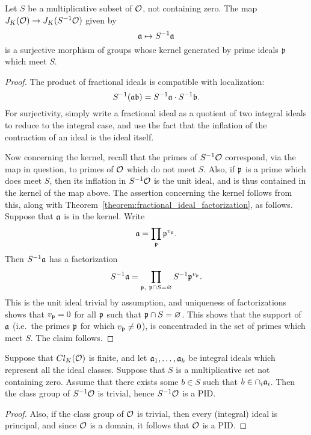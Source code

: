 \begin{proposition}
  Let $S$ be a multiplicative subset of $\mathcal{O}$, not containing zero.
  The map $J_{K}(\mathcal{O}) \to J_{K}(S^{-1}\mathcal{O})$ given by
  \[ \mathfrak{a} \mapsto S^{-1} \mathfrak{a} \]
  is a surjective morphism of groups whose kernel generated by prime ideals $\mathfrak{p}$ which meet $S$.
\end{proposition}
\begin{proof}
  The product of fractional ideals is compatible with localization:
  \[ S^{-1}(\mathfrak{a} \mathfrak{b}) = S^{-1}\mathfrak{a} \cdot S^{-1} \mathfrak{b}. \]
  For surjectivity, simply write a fractional ideal as a quotient of two integral ideals to reduce to the integral case, and use the fact that the inflation of the contraction of an ideal is the ideal itself.

  Now concerning the kernel, recall that the primes of $S^{-1}\mathcal{O}$ correspond, via the map in question, to primes of $\mathcal{O}$ which do not meet $S$.
  Also, if $\mathfrak{p}$ is a prime which does meet $S$, then its inflation in $S^{-1}\mathcal{O}$ is the unit ideal, and is thus contained in the kernel of the map above.
  The assertion concerning the kernel follows from this, along with Theorem~\ref{theorem:fractional_ideal_factorization}, as follows.
  Suppose that $\mathfrak{a}$ is in the kernel.
  Write
  \[ \mathfrak{a} = \prod_{\mathfrak{p}} \mathfrak{p}^{v_{\mathfrak{p}}}. \]
  Then $S^{-1}\mathfrak{a}$ has a factorization
  \[ S^{-1}\mathfrak{a} = \prod_{\mathfrak{p}, \ \mathfrak{p} \cap S = \varnothing} S^{-1}\mathfrak{p}^{v_{\mathfrak{p}}}. \]
  This is the unit ideal trivial by assumption, and uniqueness of factorizations shows that $v_{\mathfrak{p}} = 0$ for all $\mathfrak{p}$ such that $\mathfrak{p} \cap S = \varnothing$.
  This shows that the support of $\mathfrak{a}$ (i.e.~the primes $\mathfrak{p}$ for which $v_{\mathfrak{p}} \neq 0$), is concentraded in the set of primes which meet $S$.
  The claim follows.
\end{proof}

\begin{proposition}
  Suppose that $Cl_{K}(\mathcal{O})$ is finite, and let $\mathfrak{a}_{1},\ldots,\mathfrak{a}_{k}$ be integral ideals which represent all the ideal classes.
  Suppose that $S$ is a multiplicative set not containing zero.
  Assume that there exists some $b \in S$ such that $b \in \cap_{i} \mathfrak{a}_{i}$.
  Then the class group of $S^{-1}\mathcal{O}$ is trivial, hence $S^{-1}\mathcal{O}$ is a PID.
\end{proposition}
\begin{proof}
  Also, if the class group of $\mathcal{O}$ is trivial, then every (integral) ideal is principal, and since $\mathcal{O}$ is a domain, it follows that $\mathcal{O}$ is a PID.
\end{proof}

